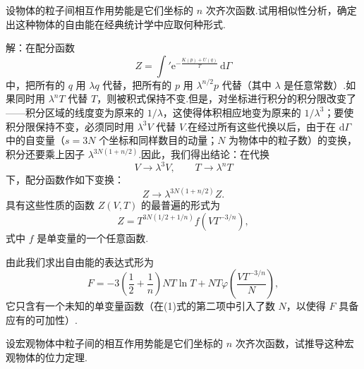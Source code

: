 \begin{xiti}

\quad 设物体的粒子间相互作用势能是它们坐标的 $n$ 次齐次函数.试用相似性分析，确定出这种物体的自由能在经典统计学中应取何种形式.

解：在配分函数
\begin{equation*}
  Z=\int'\mathrm{e}^{-\frac{K(p)+U(q)}{T}}\,\mathrm{d}\varGamma
\end{equation*}
中，把所有的 $q$ 用 $\lambda q$ 代替，把所有的 $p$ 用 $\lambda^{n/2}p$ 代替（其中 $\lambda$ 是任意常数）.如果同时用 $\lambda^n T$ 代替 $T$，则被积式保持不变.但是，对坐标进行积分的积分限改变了——积分区域的线度变为原来的 $1/\lambda$，这使得体积相应地变为原来的 $1/\lambda^3$；要使积分限保持不变，必须同时用 $\lambda^3V$ 代替 $V$.在经过所有这些代换以后，由于在 $\mathrm{d}\varGamma$ 中的自变量（$s=3N$ 个坐标和同样数目的动量；$N$ 为物体中的粒子数）的变换，积分还要乘上因子 $\lambda^{3N(1+n/2)}$.因此，我们得出结论：在代换
\begin{equation*}
  V\to\lambda^3V,\qquad T\to\lambda^nT
\end{equation*}
下，配分函数作如下变换：
\begin{equation*}
  Z\to\lambda^{3N(1+n/2)}Z.
\end{equation*}
具有这些性质的函数 $Z(V,T)$ 的最普遍的形式为
\begin{equation*}
  Z=T^{3N(1/2+1/n)}f\left(VT^{-3/n}\right),
\end{equation*}
式中 $f$ 是单变量的一个任意函数.

由此我们求出自由能的表达式形为
\begin{equation*}
  F=-3\left(\frac{1}{2}+\frac{1}{n}\right)NT\ln T+NT\varphi\left(\frac{VT^{-3/n}}{N}\right),
\end{equation*}
它只含有一个未知的单变量函数（在(1)式的第二项中引入了数 $N$，以使得 $F$ 具备应有的可加性）.

\quad 设宏观物体中粒子间的相互作用势能是它们坐标的 $n$ 次齐次函数，试推导这种宏观物体的位力定理.


\end{xiti}
